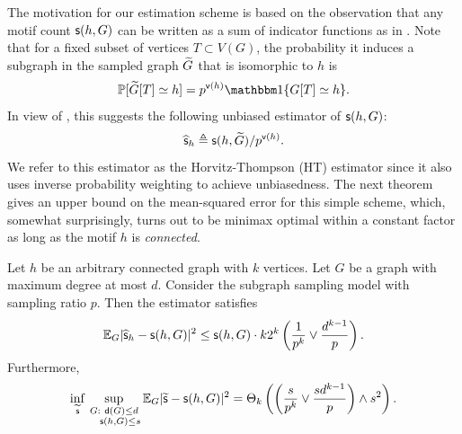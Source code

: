 The motivation for our estimation scheme is based on the observation that any motif count $ \mathsf{s}(h, G) $ can be written as a sum of indicator functions 
as in . 
Note that for a fixed subset of vertices $ T \subset V(G) $, the probability it induces a subgraph in the sampled graph ${\widetilde{G}}$ that is isomorphic to $h$ is
\[
 \pprob{\tG[T]\simeq h} = p^{\sfv(h)}\Indc\{ G[T] \simeq h\} .
\] 
In view of , this suggests the following unbiased estimator of $ \mathsf{s}(h, G) $:
\begin{equation}
\widehat{\mathsf{s}}_h \triangleq 
 \mathsf{s}(h, {\widetilde{G}})/p^{{\mathsf{v}}(h)}.
\label{eq:HT}
\end{equation}
We refer to this estimator as the Horvitz-Thompson (HT) estimator \cite{HT52} since it also uses inverse probability weighting to achieve unbiasedness.
The next theorem gives an upper bound on the mean-squared error for this simple scheme, 
which, somewhat surprisingly, turns out to be minimax optimal within a constant factor as long as the motif $h$ is \emph{connected}.

\begin{theorem}
\label{thm:subgraph-main}
Let $h$ be an arbitrary connected graph with $k$ vertices.
Let $ G $ be a graph with maximum degree at most $ d $. 
Consider the subgraph sampling model with sampling ratio $p$.
Then the estimator  satisfies
\[
\mathbb{E}_G|\widehat{\mathsf{s}}_h-\mathsf{s}(h, G)|^2 \leq  \mathsf{s}(h,G) \cdot k 2^k \left(\frac{1}{p^{k}} \vee  \frac{d^{k-1}}{p}\right).
\]
Furthermore,
\[
\inf_{\widetilde{\mathsf{s}}} \sup_{\substack{G: ~{\mathsf{d}}(G)\leq d\\ ~~~\mathsf{s}(h,G) \leq s}} \mathbb{E}_G|\widetilde{\mathsf{s}} -\mathsf{s}(h,G)|^2 = \Theta_{k} \left( \left(\frac{s}{p^{k}} \vee  \frac{s d^{k-1}}{p}\right) \wedge s^2 \right).
\]
\end{theorem}
%
%

